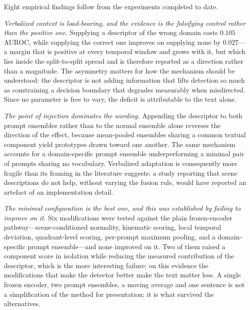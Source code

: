 \documentclass[a4paper,fleqn]{cas-sc}
\begin{document}
Eight empirical findings follow from the experiments completed to date.

\emph{Verbalized context is load-bearing, and the evidence is the falsifying
control rather than the positive one.} Supplying a descriptor of the wrong
domain costs $0.105$ AUROC, while supplying the correct one improves on
supplying none by $0.027$---a margin that is positive at every temporal window
and grows with it, but which lies inside the split-to-split spread and is
therefore reported as a direction rather than a magnitude. The asymmetry matters
for how the mechanism should be understood: the descriptor is not adding
information that lifts detection so much as constraining a decision boundary
that degrades measurably when misdirected. Since no parameter is free to vary,
the deficit is attributable to the text alone.

\emph{The point of injection dominates the wording.} Appending the descriptor to
both prompt ensembles rather than to the normal ensemble alone reverses the
direction of the effect, because mean-pooled ensembles sharing a common textual
component yield prototypes drawn toward one another. The same mechanism accounts
for a domain-specific prompt ensemble underperforming a minimal pair of prompts
sharing no vocabulary. Verbalized adaptation is consequently more fragile than
its framing in the literature suggests: a study reporting that scene
descriptions do not help, without varying the fusion rule, would have reported
an artefact of an implementation detail.

\emph{The minimal configuration is the best one, and this was established by
failing to improve on it.} Six modifications were tested against the plain
frozen-encoder pathway---scene-conditioned normality, kinematic scoring, local
temporal deviation, quadrant-level scoring, per-prompt maximum pooling, and a
domain-specific prompt ensemble---and none improved on it. Two of them raised a
component score in isolation while reducing the measured contribution of the
descriptor, which is the more interesting failure: on this evidence the
modifications that make the detector better make the text matter less. A single
frozen encoder, two prompt ensembles, a moving average and one sentence is not a
simplification of the method for presentation; it is what survived the
alternatives.
\end{document}
